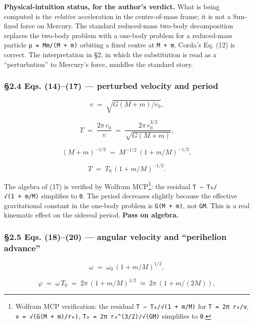 \documentclass[
  11pt,
]{article}
\begin{document}
\textbf{Physical-intuition status, for the author's verdict.} What is
being computed is the \emph{relative} acceleration in the centre-of-mass
frame; it is not a Sun-fixed force on Mercury. The standard reduced-mass
two-body decomposition replaces the two-body problem with a one-body
problem for a reduced-mass particle \texttt{μ\ =\ Mm/(M\ +\ m)} orbiting
a fixed centre at \texttt{M\ +\ m}. Corda's Eq. (12) is correct. The
interpretation in §2, in which the substitution is read as a
``perturbation'' to Mercury's force, muddles the standard story.

\hypertarget{eqs.-1417-perturbed-velocity-and-period}{%
\subsubsection{§2.4 Eqs. (14)--(17) --- perturbed velocity and
period}\label{eqs.-1417-perturbed-velocity-and-period}}

\[
v \;=\; \sqrt{G(M+m)/r_{0}}, \tag{14}
\]

\[
T \;=\; \frac{2\pi\,r_{0}}{v} \;=\; \frac{2\pi\,r_{0}^{3/2}}{\sqrt{G(M+m)}}, \tag{15}
\]

\[
(M+m)^{-1/2} \;=\; M^{-1/2}\,(1 + m/M)^{-1/2}, \tag{16}
\]

\[
T \;=\; T_{0}\,(1 + m/M)^{-1/2}. \tag{17}
\]

The algebra of (17) is verified by Wolfram MCP\footnote{Wolfram MCP
  verification: the residual \texttt{T\ −\ T₀/√(1\ +\ m/M)} for
  \texttt{T\ =\ 2π\ r₀/v}, \texttt{v\ =\ √(G(M\ +\ m)/r₀)},
  \texttt{T₀\ =\ 2π\ r₀\^{}(3/2)/√(GM)} simplifies to \texttt{0}.}: the
residual \texttt{T\ −\ T₀/√(1\ +\ m/M)} simplifies to \texttt{0}. The
period decreases slightly because the effective gravitational constant
in the one-body problem is \texttt{G(M\ +\ m)}, not \texttt{GM}. This is
a real kinematic effect on the sidereal period. \textbf{Pass on
algebra.}

\hypertarget{eqs.-1820-angular-velocity-and-perihelion-advance}{%
\subsubsection{§2.5 Eqs. (18)--(20) --- angular velocity and
``perihelion
advance''}\label{eqs.-1820-angular-velocity-and-perihelion-advance}}

\[
\omega \;=\; \omega_{0}\,(1 + m/M)^{1/2}, \tag{18}
\]

\[
\varphi \;=\; \omega\,T_{0} \;=\; 2\pi\,(1 + m/M)^{1/2}
\;\simeq\; 2\pi\,(1 + m/(2M)), \tag{19}
\]
\end{document}
